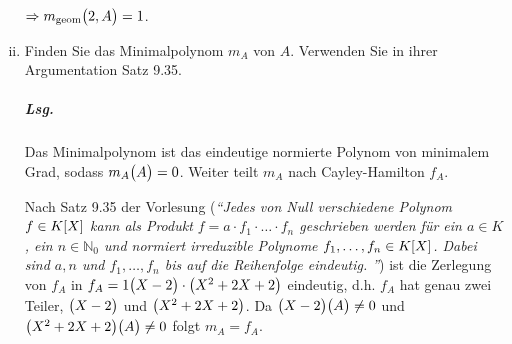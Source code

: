 \documentclass{scrreprt}
\begin{document}
\begin{enumerate}[(i)]
  $\Rightarrow m_{\text{geom}}\qty\big(2, A) = 1$.

\item Finden Sie das Minimalpolynom $m_A$ von $A$.
  Verwenden Sie in ihrer Argumentation Satz 9.35.

  \subparagraph{Lsg.} Das Minimalpolynom ist das eindeutige normierte Polynom
  von minimalem Grad, sodass $m_A\qty\big(A) = 0$.
  Weiter teilt $m_A$ nach Cayley-Hamilton $f_A$.

  Nach Satz 9.35 der Vorlesung (\emph{``Jedes von Null verschiedene Polynom
    $f \in K\qty[X]$ kann als Produkt $f = a \cdot f_1 \cdot \ldots \cdot f_n$
    geschrieben werden für ein $a \in K$, ein $n \in \mathbb{N}_0$ und normiert
    irreduzible Polynome $f_1, \ldots, f_n \in K\qty[X]$.
    Dabei sind $a, n$ und $f_1, \ldots, f_n$ bis auf die Reihenfolge eindeutig.
    ''}) ist die Zerlegung von $f_A$ in
  $f_A = 1 \qty\big(X - 2) \cdot \qty\big(X^2 + 2X + 2)$ eindeutig, d.h. $f_A$
  hat genau zwei Teiler, $\qty\big(X - 2)$ und $\qty\big(X^2 + 2X + 2)$.
  Da $\qty\big(X - 2)\qty\big(A) \ne 0$ und
  $\qty\big(X^2 + 2X + 2)\qty\big(A) \ne 0$ folgt $m_A = f_A$.
\end{enumerate}
\end{document}
